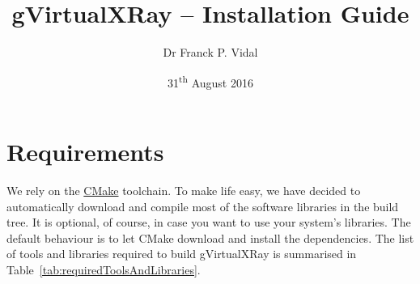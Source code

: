 \documentclass[11pt,oneside,a4paper,final]{article}
\title{gVirtualXRay -- Installation Guide}
\author{Dr Franck P. Vidal}
\date{31\textsuperscript{th} August 2016}
\begin{document}
 \sloppy

\maketitle

\newpage
{}
{}
\tableofcontents

% 
\newpage
{}
{}
\listoftables

\newpage


\section{Requirements}

	We rely on the \href{http://www.cmake.org/}{CMake} toolchain. 
	To make life easy, we have decided to automatically download and compile most of the software libraries in the build tree. 
	It is optional, of course, in case you want to use your system's libraries. 
	The default behaviour is to let CMake download and install the dependencies.
	The list of tools and libraries required to build gVirtualXRay is summarised in Table~\ref{tab:requiredToolsAndLibraries}.
\end{document}
